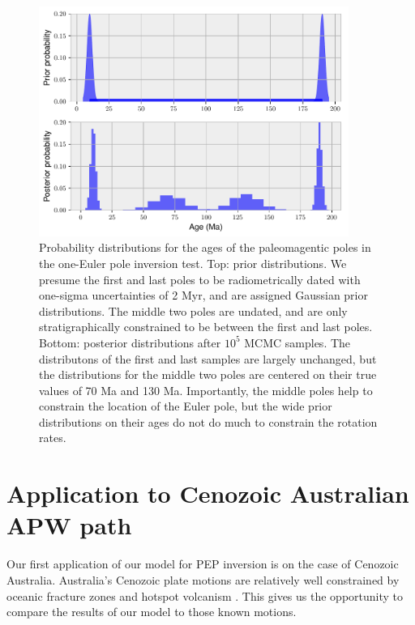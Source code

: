 \documentclass[preprint,12pt,authoryear]{elsarticle}
\begin{document}
\begin{figure}
\includegraphics[width=0.9\textwidth]{figures/synthetic/age_uncertainty_samples.pdf}
\caption[Probability distributions for ages of the paleomagnetic poles in the one-Euler pole inversion test.]{Probability distributions for the ages of the paleomagentic poles in the one-Euler pole inversion test. Top: prior distributions. We presume the first and last poles to be radiometrically dated with one-sigma uncertainties of 2 Myr, and are assigned Gaussian prior distributions. The middle two poles are undated, and are only stratigraphically constrained to be between the first and last poles. Bottom: posterior distributions after $10^5$ MCMC samples. The distributons of the first and last samples are largely unchanged, but the distributions for the middle two poles are centered on their true values of 70 Ma and 130 Ma. Importantly, the middle poles help to constrain the location of the Euler pole, but the wide prior distributions on their ages do not do much to constrain the rotation rates.}
\label{fig:age_uncertainty_samples}
\end{figure}

\section{Application to Cenozoic Australian APW path}
\label{sec:australia}
\clearpage
Our first application of our model for PEP inversion is on the case of Cenozoic Australia.
Australia's Cenozoic plate motions are relatively well constrained by oceanic fracture zones
and hotspot volcanism \citep{muller1993revised, seton2012global}.
This gives us the opportunity to compare the results of our model to those known motions.
\end{document}
